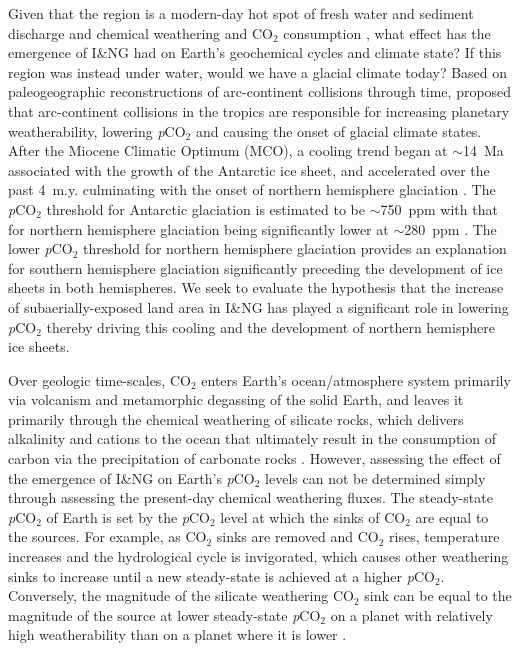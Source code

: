 \documentclass[11pt,letterpaper]{article}
\newcommand{\pCOtwo}{\textit{p}CO$_{2}$\xspace}
\newcommand{\COtwo}{CO$_{2}$\xspace}
\begin{document}
Given that the region is a modern-day hot spot of fresh water and sediment discharge \citep{Milliman2013a} and chemical weathering and \COtwo consumption \citep{Hartmann2009a}, what effect has the emergence of I\&NG had on Earth's geochemical cycles and climate state? If this region was instead under water, would we have a glacial climate today? Based on paleogeographic reconstructions of arc-continent collisions through time, \citet{Macdonald2019a} proposed that arc-continent collisions in the tropics are responsible for increasing planetary weatherability, lowering \pCOtwo and causing the onset of glacial climate states. After the Miocene Climatic Optimum (MCO), a cooling trend began at $\sim$14~Ma associated with the growth of the Antarctic ice sheet, and accelerated over the past 4~m.y. culminating with the onset of northern hemisphere glaciation \citep{Shackleton1984a, Zachos2001a}. The \pCOtwo threshold for Antarctic glaciation is estimated to be $\sim$750~ppm with that for northern hemisphere glaciation being significantly lower at $\sim$280~ppm \citep{DeConto2008a}. The lower \pCOtwo threshold for northern hemisphere glaciation provides an explanation for southern hemisphere glaciation significantly preceding the development of ice sheets in both hemispheres. We seek to evaluate the hypothesis that the increase of subaerially-exposed land area in I\&NG has played a significant role in lowering \pCOtwo thereby driving this cooling and the development of northern hemisphere ice sheets.

Over geologic time-scales, \COtwo enters Earth's ocean/atmosphere system primarily via volcanism and metamorphic degassing of the solid Earth, and leaves it primarily through the chemical weathering of silicate rocks, which delivers alkalinity and cations to the ocean that ultimately result in the consumption of carbon via the precipitation of carbonate rocks \citep{Kump2000a}. However, assessing the effect of the emergence of I\&NG on Earth's \pCOtwo levels can not be determined simply through assessing the present-day chemical weathering fluxes. The steady-state \pCOtwo of Earth is set by the \pCOtwo level at which the sinks of \COtwo are equal to the sources. For example, as \COtwo sinks are removed and \COtwo rises, temperature increases and the hydrological cycle is invigorated, which causes other weathering sinks to increase until a new steady-state is achieved at a higher \pCOtwo. Conversely, the magnitude of the silicate weathering \COtwo sink can be equal to the magnitude of the source at lower steady-state \pCOtwo on a planet with relatively high weatherability than on a planet where it is lower \citep{Kump1997a}.
\end{document}
